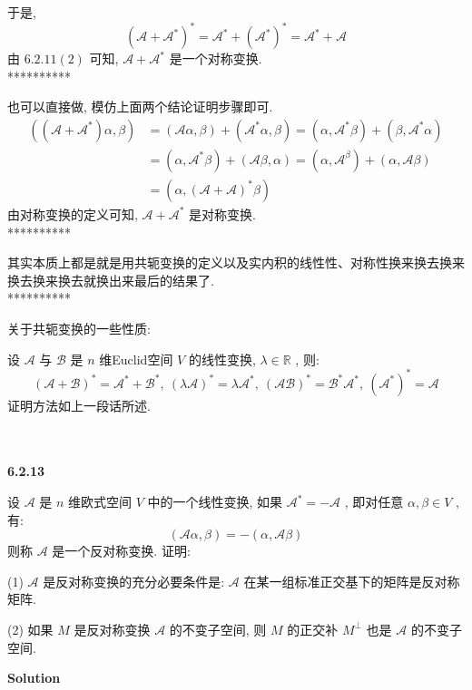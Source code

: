 \documentclass[11pt,a4paper,openany,oneside]{book}
\newcommand\Solution{\noindent\textbf{\textsf{Solution}}\par\medskip}
\begin{document}
于是,
 $$  (\mathcal{A} + \mathcal{A}^*)^* = \mathcal{A}^* + (\mathcal{A}^*)^* = \mathcal{A}^* + \mathcal{A}  $$ 
由 $ 6.2.11(2) $ 可知,  $ \mathcal{A} + \mathcal{A}^* $ 是一个对称变换.  \\

**********

也可以直接做, 模仿上面两个结论证明步骤即可.
\begin{align*}
((\mathcal{A}+\mathcal{A}^*)\alpha, \beta) &= (\mathcal{A}\alpha, \beta) + (\mathcal{A}^*\alpha, \beta) = (\alpha, \mathcal{A}^*\beta) + (\beta, \mathcal{A}^*\alpha) \\
&= (\alpha, \mathcal{A}^*\beta) + (\mathcal{A}\beta, \alpha) = (\alpha, \mathcal{A}^\beta) + (\alpha, \mathcal{A}\beta) \\
&= (\alpha, (\mathcal{A}+\mathcal{A})^*\beta)
\end{align*}
由对称变换的定义可知,  $ \mathcal{A} + \mathcal{A}^* $ 是对称变换.  \\

**********

其实本质上都是就是用共轭变换的定义以及实内积的线性性、对称性换来换去换来换去换来换去就换出来最后的结果了. \\ 

**********

关于共轭变换的一些性质:

设 $ \mathcal{A} $ 与 $ \mathcal{B} $ 是 $ n $ 维Euclid空间 $ V $ 的线性变换,  $ \lambda \in \mathbb{R} $ , 则:
 $$  (\mathcal{A}+\mathcal{B})^* = \mathcal{A}^* + \mathcal{B}^*, \ (\lambda\mathcal{A})^* = \lambda\mathcal{A}^*, \ (\mathcal{AB})^* = \mathcal{B}^*\mathcal{A}^*, \ (\mathcal{A}^*)^* = \mathcal{A}  $$ 
证明方法如上一段话所述. \\  \\  \\ 


\begin{myexample}
	\textbf{6.2.13}

设 $ \mathcal{A} $ 是 $ n $ 维欧式空间 $ V $ 中的一个线性变换, 如果 $ \mathcal{A}^* = - \mathcal{A} $ , 即对任意 $ \alpha, \beta \in V $ , 有:
 $$  (\mathcal{A}\alpha, \beta) = - (\alpha, \mathcal{A}\beta)  $$ 
则称 $ \mathcal{A} $ 是一个反对称变换. 证明:

(1)  $ \mathcal{A} $ 是反对称变换的充分必要条件是:  $ \mathcal{A} $ 在某一组标准正交基下的矩阵是反对称矩阵. 

(2) 如果 $ M $ 是反对称变换 $ \mathcal{A} $ 的不变子空间, 则 $ M $ 的正交补 $ M^{\perp} $ 也是 $ \mathcal{A} $ 的不变子空间.\\

\end{myexample}
\Solution
\end{document}

